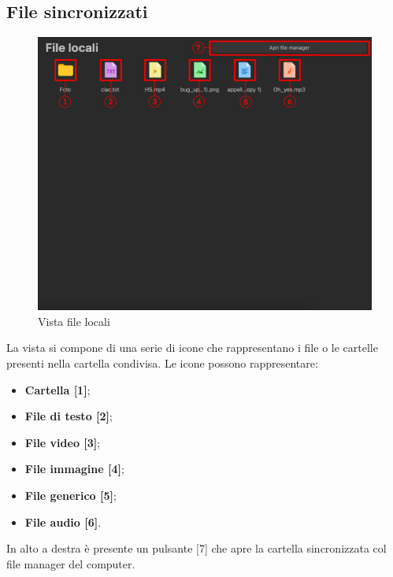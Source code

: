 \subsection{File sincronizzati}
\label{sec:fileSincronizzati}
\begin{figure}[H]
    \centering
    \includegraphics[scale = 0.7]{components/img/fileLocali.png}
    \caption{Vista file locali}
    \label{fig:fileSync}
\end{figure}
La vista si compone di una serie di icone che rappresentano i file o le cartelle presenti nella cartella condivisa. Le icone possono rappresentare:
\begin{itemize}
\item \textbf{Cartella [1]};\
\item \textbf{File di testo [2]};\
\item \textbf{File video [3]};\
\item \textbf{File immagine [4]};\
\item \textbf{File generico [5]};\
\item \textbf{File audio [6]}.\
\end{itemize}
In alto a destra è presente un pulsante [7] che apre la cartella sincronizzata col file manager del computer.


